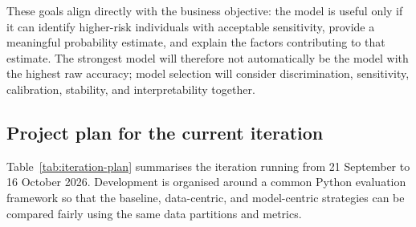 These goals align directly with the business objective: the model is useful only if it can identify higher-risk individuals with acceptable sensitivity, provide a meaningful probability estimate, and explain the factors contributing to that estimate. The strongest model will therefore not automatically be the model with the highest raw accuracy; model selection will consider discrimination, sensitivity, calibration, stability, and interpretability together.

\subsection{Project plan for the current iteration}
\label{subsec:project-plan}

Table~\ref{tab:iteration-plan} summarises the iteration running from 21 September to 16 October 2026. Development is organised around a common Python evaluation framework so that the baseline, data-centric, and model-centric strategies can be compared fairly using the same data partitions and metrics.


